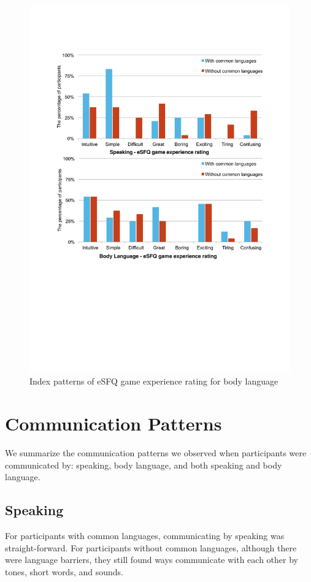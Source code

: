 \begin{figure}[!h]
\centering
\includegraphics[width=1.0\columnwidth]{Figures/US_Consistent_Bodylanguage.pdf}
\caption{Index patterns of eSFQ game experience rating for body language}
\label{fig:US_Consistent_Bodylanguage}
\end{figure}



\section{Communication Patterns}
We summarize the communication patterns we observed when participants were communicated by: speaking, body language, and both speaking and body language.

\subsection{Speaking}
For participants with common languages, communicating by speaking was straight-forward. For participants without common languages, although there were language barriers, they still found ways communicate with each other by tones, short words, and sounds.


